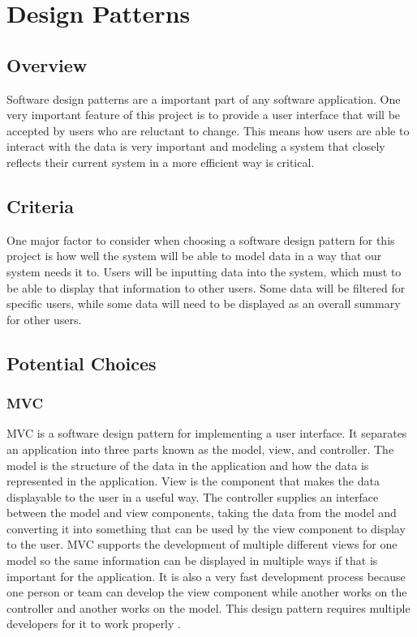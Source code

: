 \documentclass[onecolumn, draftclsnofoot,10pt, compsoc]{IEEEtran}
\begin{document}
\section{Design Patterns}

\subsection{Overview}
Software design patterns are a important part of any software application. One very important feature of this project is to provide a user interface that will be accepted by users who are reluctant to change. This means how users are able to interact with the data is very important and modeling a system that closely reflects their current system in a more efficient way is critical.

\subsection{Criteria}
One major factor to consider when choosing a software design pattern for this project is how well the system will be able to model data in a way that our system needs it to. Users will be inputting data into the system, which must to be able to display that information to other users. Some data will be filtered for specific users, while some data will need to be displayed as an overall summary for other users.

\subsection{Potential Choices}

\subsubsection{MVC}
MVC is a software design pattern for implementing a user interface. It separates an application into three parts known as the model, view, and controller. The model is the structure of the data in the application and how the data is represented in the application. View is the component that makes the data displayable to the user in a useful way. The controller supplies an interface between the model and view components, taking the data from the model and converting it into something that can be used by the view component to display to the user. MVC supports the development of multiple different views for one model so the same information can be displayed in multiple ways if that is important for the application. It is also a very fast development process because one person or team can develop the view component while another works on the controller and another works on the model. This design pattern requires multiple developers for it to work properly \cite{mvc}.
\end{document}
